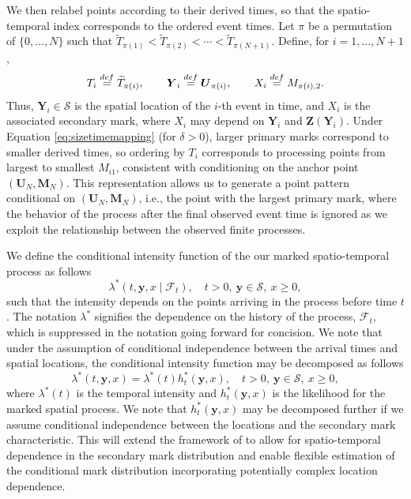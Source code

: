 {We then relabel points according to their derived times, so that the spatio-temporal index corresponds to the ordered event times.
Let \(\pi\) be a permutation of \(\{0,\dots,N\}\) such that
\(\widetilde{T}_{\pi(1)} < \widetilde{T}_{\pi(2)} < \cdots < \widetilde{T}_{\pi(N+1)}\).
Define, for \(i = 1,\dots,N+1\),
\[
T_i \stackrel{\tiny def}{=}\widetilde{T}_{\pi(i)}, \qquad \boldsymbol{Y}_i \stackrel{\tiny def}{=}\boldsymbol{U}_{\pi(i)}, \qquad X_i \stackrel{\tiny def}{=}M_{\pi(i),2}.
\]
Thus, \(\boldsymbol{Y}_i \in \mathscr{S}\) is the spatial location of the \(i\)-th event in time, and \(X_i\) is the associated secondary mark, where \(X_i\) may depend on \(\boldsymbol{Y}_i\) and \(\boldsymbol{Z}(\boldsymbol{Y}_i)\).
Under Equation \eqref{eq:sizetimemapping} (for \(\delta > 0\)), larger primary marks correspond to smaller derived times, so ordering by \(T_i\) corresponds to processing points from largest to smallest \(M_{i1}\), consistent with conditioning on the anchor point \((\boldsymbol{U}_N, \boldsymbol{M}_N)\). This representation allows us to generate a point pattern conditional on \((\boldsymbol{U}_N, \boldsymbol{M}_N)\), i.e., the point with the largest primary mark, where the behavior of the process after the final observed event time is ignored as we exploit the relationship between the observed finite processes.}

We define the conditional intensity function of the our marked
spatio-temporal process as follows \[
\lambda^*(t, \boldsymbol{y}, x \mid \mathscr{F}_t), \quad t > 0, \ \boldsymbol{y} \in \mathscr{S}, \ x \geq 0,
\] such that the intensity depends on the points arriving in the process
before time \(t\). The notation \(\lambda^*\) signifies the dependence on
the history of the process, \(\mathscr{F}_t\), which is suppressed in the
notation going forward for concision. We note that under the assumption
of conditional independence between the arrival times and spatial
locations, the conditional intensity function may be decomposed as
follows \[
\lambda^*(t, \boldsymbol{y}, x) = \lambda^*(t) h_t^*(\boldsymbol{y}, x),\quad t > 0, \ \boldsymbol{y} \in \mathscr{S}, \ x \geq 0,
\] where \(\lambda^*(t)\) is the temporal intensity and
\(h_t^*(\boldsymbol{y}, x)\) is the likelihood for the marked spatial
process. We note that \(h_t^*(\boldsymbol{y}, x)\) may be decomposed
further if we assume conditional independence between the locations and
the secondary mark characteristic. This will extend the framework of
\citet{mollerMechanisticSpatiotemporalPoint2016a} to allow for spatio-temporal
dependence in the secondary mark distribution and enable flexible
estimation of the conditional mark distribution incorporating
potentially complex location dependence.

